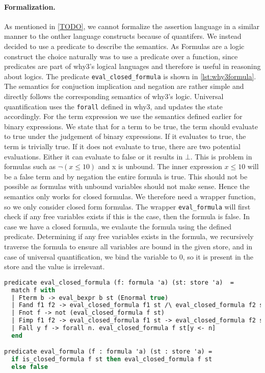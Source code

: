 \paragraph{Formalization.}
As mentioned in \autoref{TODO}, we cannot formalize the assertion language in a similar manner to
the onther language constructs because of quantifers.
We instead decided to use a predicate to describe the semantics.
As Formulas are a logic construct the choice naturally was to use a predicate over a function,
since predicates are part of why3's logical languages and therefore is useful in reasoning about logics.
The predicate \texttt{eval\_closed\_formula} is shown in \autoref{lst:why3formula}.
The semantics for conjuction implication and negation are rather simple and directly follows the corresponding
semantics of why3's logic.
Universal quantification uses the \texttt{forall} defined in why3, and updates the state accordingly.
For the term expression we use the semantics defined earlier for binary expressions.
We state that for a term to be true, the term should evaluate to true under the judgement of binary expressions.
If it evaluates to true, the term is trivially true.
If it does not evaluate to true, there are two potential evaluations.
Either it can evaluate to false or it results in $\bot$.
This is problem in formulas such as $\neg (x \le 10)$ and x is unbound.
The inner expression $x \le 10$ will be a false term and by negation the entire formula is true.
This should not be possible as formulas with unbound variables should not make sense.
Hence the semantics only works for closed formulas.
We therefore need a wrapper function, so we only consider closed form formulas.
The wrapper \texttt{eval\_formula} will first check if any free variables exists
if this is the case, then the formula is false.
In case we have a closed formula, we evalaute the formula using the defined predicate.
Determining if any free variables exists in the formula, we recursively traverse the formula to ensure all variables are bound in the given store,
and in case of universal quantification, we bind the variable to 0,
so it is present in the store and the value is irrelevant.

\begin{lstlisting}[caption={Predicate defining the semantics of formulas},label={lst:why3formula},language=sml]
predicate eval_closed_formula (f: formula 'a) (st: store 'a)  =
  match f with
  | Fterm b -> eval_bexpr b st (Enormal true)
  | Fand f1 f2 -> eval_closed_formula f1 st /\ eval_closed_formula f2 st
  | Fnot f -> not (eval_closed_formula f st)
  | Fimp f1 f2 -> eval_closed_formula f1 st -> eval_closed_formula f2 st
  | Fall y f -> forall n. eval_closed_formula f st[y <- n]
  end

predicate eval_formula (f : formula 'a) (st : store 'a) =
  if is_closed_formula f st then eval_closed_formula f st
  else false
\end{lstlisting}

